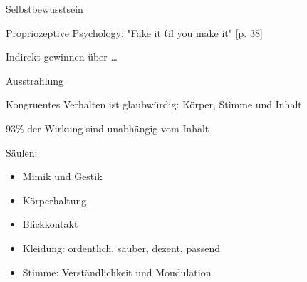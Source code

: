 \begin{frame}{Selbstbewusstsein}

  Propriozeptive Psychology: "Fake it \'til you make it" \cite{mccarthy_advanced_2015}[p. 38]


  Indirekt gewinnen über \ldots 

\end{frame}

\begin{frame}{Ausstrahlung}

  Kongruentes Verhalten ist glaubwürdig: Körper, Stimme und Inhalt \cite{wannenwetsch_erfolgreicher_2009}

  93\% der Wirkung sind unabhängig vom Inhalt \cite{wannenwetsch_erfolgreicher_2009}


  Säulen:
  \begin{itemize}
    \item Mimik und Gestik
    \item Körperhaltung
    \item Blickkontakt
    \item Kleidung: ordentlich, sauber, dezent, passend 
    \item Stimme: Verständlichkeit und Moudulation 
  \end{itemize}



\end{frame}
